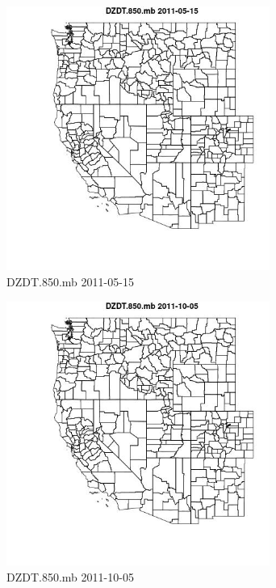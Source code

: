 \begin{figure} 
\centering  
\includegraphics[width=0.77\textwidth]{Code_Outputs/ML_input_report_ML_input_PM25_Step5_part_d_de_duplicated_aves_ML_input_MapObsDZDT850mb2011-05-15.jpg} 
\caption{\label{fig:ML_input_report_ML_input_PM25_Step5_part_d_de_duplicated_aves_ML_inputMapObsDZDT850mb2011-05-15}DZDT.850.mb 2011-05-15} 
\end{figure} 
 

\begin{figure} 
\centering  
\includegraphics[width=0.77\textwidth]{Code_Outputs/ML_input_report_ML_input_PM25_Step5_part_d_de_duplicated_aves_ML_input_MapObsDZDT850mb2011-10-05.jpg} 
\caption{\label{fig:ML_input_report_ML_input_PM25_Step5_part_d_de_duplicated_aves_ML_inputMapObsDZDT850mb2011-10-05}DZDT.850.mb 2011-10-05} 
\end{figure} 
 

